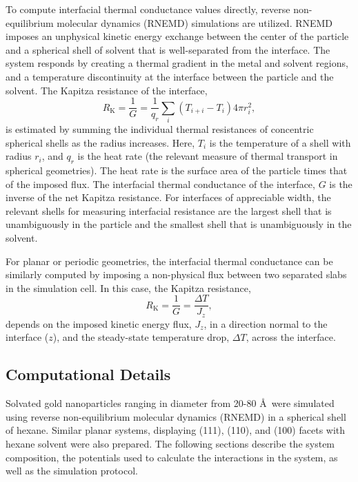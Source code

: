 To compute interfacial thermal conductance values directly,
reverse non-equilibrium molecular dynamics (RNEMD)
simulations are utilized.\cite{Muller-Plathe:1997wq,Kuang:2012fe} RNEMD imposes an
unphysical kinetic energy exchange between the center of the particle
and a spherical shell of solvent that is well-separated from the
interface.  The system responds by creating a thermal gradient in the
metal and solvent regions, and a temperature discontinuity at the
interface between the particle and the solvent. The Kapitza resistance
of the interface,
\begin{equation}
  R_\mathrm{K} = \frac{1}{G} = \frac{1}{q_r} \sum_i \left(T_{i+i} - T_i\right) 4 \pi r_i^2,
  \label{sphericalG}
\end{equation}
is estimated by summing the individual thermal resistances of
concentric spherical shells as the radius
increases.\cite{Stocker:2014qq} Here, $T_i$ is the temperature of a
shell with radius $r_i$, and $q_r$ is the heat rate (the relevant
measure of thermal transport in spherical geometries). The heat rate
is the surface area of the particle times that of the imposed
flux. The interfacial thermal conductance of the interface, $G$ is the
inverse of the net Kapitza resistance.  For interfaces of appreciable
width, the relevant shells for measuring interfacial resistance are
the largest shell that is unambiguously in the particle and the
smallest shell that is unambiguously in the solvent.

For planar or periodic geometries, the interfacial thermal conductance
can be similarly computed by imposing a non-physical flux between two
separated slabs in the simulation cell. In this case, the Kapitza
resistance,
\begin{equation}
  R_\mathrm{K} = \frac{1}{G} = \frac{\Delta T}{J_z},
\label{planarG}
\end{equation}
depends on the imposed kinetic energy flux, $J_z$, in a direction
normal to the interface ($z$), and the steady-state temperature drop,
$\Delta T$, across the interface.\cite{Kuang:2012fe}


\subsection{Computational Details}

Solvated gold nanoparticles ranging in diameter from 20-80 \AA\ were
simulated using reverse non-equilibrium molecular dynamics (RNEMD) in
a spherical shell of hexane. Similar planar systems, displaying (111),
(110), and (100) facets with hexane solvent were also prepared.  The
following sections describe the system composition, 
the potentials used to calculate the
interactions in the system, as well as the simulation protocol.

